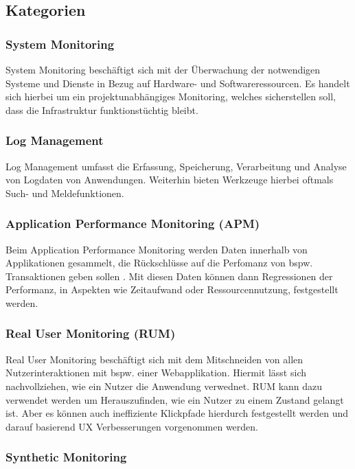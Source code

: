 \subsection{Kategorien}

\subsubsection{System Monitoring}

System Monitoring beschäftigt sich mit der Überwachung der notwendigen Systeme und Dienste in Bezug auf Hardware- und Softwareressourcen. Es handelt sich hierbei um ein projektunabhängiges Monitoring, welches sicherstellen soll, dass die Infrastruktur funktionstüchtig bleibt.

\subsubsection{Log Management}

Log Management umfasst die Erfassung, Speicherung, Verarbeitung und Analyse von Logdaten von Anwendungen. Weiterhin bieten Werkzeuge hierbei oftmals Such- und Meldefunktionen.

\subsubsection{Application Performance Monitoring (APM)}

Beim Application Performance Monitoring werden Daten innerhalb von Applikationen gesammelt, die Rückschlüsse auf die Perfomanz von bspw. Transaktionen geben sollen \cite{StudyingTheEffectivenessOfAPMTools}. Mit diesen Daten können dann Regressionen der Performanz, in Aspekten wie Zeitaufwand oder Ressourcennutzung, festgestellt werden.

\subsubsection{Real User Monitoring (RUM)}

Real User Monitoring beschäftigt sich mit dem Mitschneiden von allen Nutzerinteraktionen mit bspw. einer Webapplikation. Hiermit lässt sich nachvollziehen, wie ein Nutzer die Anwendung verwednet. RUM kann dazu verwendet werden um Herauszufinden, wie ein Nutzer zu einem Zustand gelangt ist. Aber es können auch ineffiziente Klickpfade hierdurch festgestellt werden und darauf basierend UX Verbesserungen vorgenommen werden.

\subsubsection{Synthetic Monitoring}

